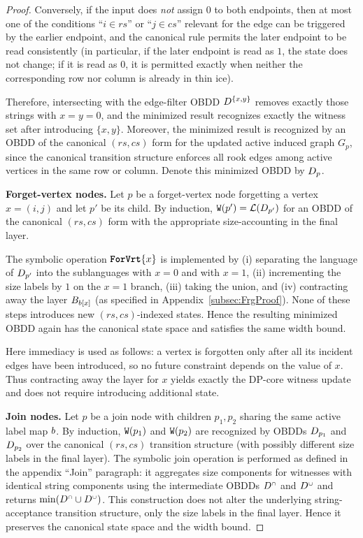 \begin{proof}
Conversely, if the input does \emph{not} assign $0$ to both endpoints, then at
most one of the conditions ``$i\in rs$'' or ``$j\in cs$'' relevant for the edge
can be triggered by the earlier endpoint, and the canonical rule permits the
later endpoint to be read consistently (in particular, if the later endpoint is
read as $1$, the state does not change; if it is read as $0$, it is permitted
exactly when neither the corresponding row nor column is already in thin ice).

Therefore, intersecting with the edge-filter OBDD
$D^{\{x,y\}}$ removes exactly those strings with $x=y=0$, and the minimized
result recognizes exactly the witness set after introducing $\{x,y\}$. Moreover,
the minimized result is recognized by an OBDD of the canonical $(rs,cs)$ form for
the updated active induced graph $G_p$, since the canonical transition structure
enforces all rook edges among active vertices in the same row or column. Denote
this minimized OBDD by $D_p$.

\smallskip
\noindent\textbf{Forget-vertex nodes.}
Let $p$ be a forget-vertex node forgetting a vertex $x=(i,j)$ and let $p'$ be
its child. By induction, $\texttt{W}(p')=\mathcal{L}(D_{p'})$ for an OBDD of the
canonical $(rs,cs)$ form with the appropriate size-accounting in the final layer.

The symbolic operation $\texttt{\textbf{ForVrt}}\{x\}$ is implemented by (i) separating
the language of $D_{p'}$ into the sublanguages with $x=0$ and with $x=1$,
(ii) incrementing the size labels by $1$ on the $x=1$ branch, (iii) taking the
union, and (iv) contracting away the layer $B_{b[x]}$ (as specified
in Appendix~\ref{subsec:FrgProof}). None of these steps introduces new
$(rs,cs)$-indexed states. Hence the resulting minimized OBDD again has the
canonical state space and satisfies the same width bound.

Here immediacy is used as follows: a vertex is forgotten only after all its
incident edges have been introduced, so no future constraint depends on the
value of $x$. Thus contracting away the layer for $x$ yields exactly the
DP-core witness update and does not require introducing additional state.

\smallskip
\noindent\textbf{Join nodes.}
Let $p$ be a join node with children $p_1,p_2$ sharing the same active label map
$b$. By induction, $\texttt{W}(p_1)$ and $\texttt{W}(p_2)$ are
recognized by OBDDs $D_{p_1}$ and $D_{p_2}$ over the canonical $(rs,cs)$
transition structure (with possibly different size labels in the final layer).
The symbolic join operation is performed as defined in the appendix ``Join''
paragraph: it aggregates size components for witnesses with identical string
components using the intermediate OBDDs $D^{{\scriptscriptstyle\cap}}$ and $D^{{\scriptscriptstyle\cup}}$
and returns $\mathrm{min}(D^{{\scriptscriptstyle\cap}}\cup D^{{\scriptscriptstyle\cup}})$. This construction
does not alter the underlying string-acceptance transition structure, only the
size labels in the final layer. Hence it preserves the canonical state space and
the width bound.


\end{proof}
